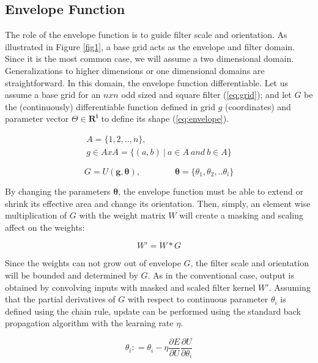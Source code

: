 \documentclass{bmvc2k}
\begin{document}
\subsection{Envelope Function}
\label{sec:methods:envelope}
The role of the envelope function is to guide filter scale and orientation. As illustrated in Figure \ref{fig1}, a base grid acts as the envelope and filter domain. Since it is the most common case, we will assume a two dimensional domain. Generalizations to higher dimensions or one dimensional domains are straightforward. In this domain, the envelope function differentiable. Let us assume a base grid for an $nxn$ odd sized and square filter (\ref{eq:grid}); and let $G$ be the (continuously) differentiable function defined in grid $g$ (coordinates) and parameter vector $\Theta \in \mathbf{R^i}$ to define its shape (\ref{eq:envelope}). 

\begin{equation}
\label{eq:grid}
\begin{gathered}
A = \{1, 2, .. , n\},
\\
g \in  A x A = \{(a, b) \: | \: a \in A \: and \: b \in A\}
\end{gathered}
\end{equation}

\begin{equation}
\label{eq:envelope}
G = U(\mathbf{g}, \mathbf{\theta}), \qquad \qquad  \mathbf{\theta} = \{\theta_1, \theta_2, .. \theta_i\}
\end{equation}

By changing the parameters $\mathbf{\theta}$, the envelope function must be able to extend or shrink its effective area and change its orientation. Then, simply, an element wise multiplication of $G$ with the weight matrix $W$ will create a masking and scaling affect on the weights:

\begin{equation}
W' = W * G
\end{equation}

Since the weights can not grow out of envelope $G$, the filter scale and orientation will be bounded and determined by $G$. As in the conventional case, output is obtained by convolving inputs with masked and scaled filter kernel $W'$.
Assuming that the partial derivatives of $G$ with respect to continuous parameter $\theta_i$ is defined using the chain rule, update can be performed using the standard back propagation algorithm with the learning rate $\eta$. 

\begin{equation}
\label{eq:genericderive}
\theta_{i} \mathrel{{:}{=}} \theta_{i} - \eta \frac{\partial E}{\partial U} \frac{\partial U}{\partial \theta_{i}}
\end{equation}
\end{document}
